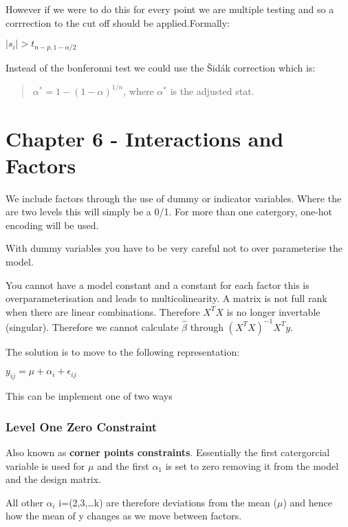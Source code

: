 \documentclass[
  letterpaper,
  DIV=11,
  numbers=noendperiod]{scrreprt}
\begin{document}
However if we were to do this for every point we are multiple testing
and so a corrrection to the cut off should be applied.Formally:

\(|s_i| > t_{n - p, 1-\alpha/2}\)

Instead of the bonferonni test we could use the Šidák correction which
is:

\begin{quote}
\(\alpha^* = 1 - (1-\alpha)^{1/n}\), where \(\alpha^*\) is the adjusted
stat.
\end{quote}

\hypertarget{chapter-6---interactions-and-factors}{%
\section{Chapter 6 - Interactions and
Factors}\label{chapter-6---interactions-and-factors}}

We include factors through the use of dummy or indicator variables.
Where the are two levels this will simply be a 0/1. For more than one
catergory, one-hot encoding will be used.

With dummy variables you have to be very careful not to over
parameterise the model.

You cannot have a model constant and a constant for each factor this is
overparameterisation and leads to multicolinearity. A matrix is not full
rank when there are linear combinations. Therefore \(X^TX\) is no longer
invertable (singular). Therefore we cannot calculate \(\hat{\beta}\)
through \((X^TX)^{-1}X^T y\).

The solution is to move to the following representation:

\(y_{ij} = \mu + \alpha_i + \epsilon_{ij}\)

This can be implement one of two ways

\hypertarget{level-one-zero-constraint}{%
\subsubsection{Level One Zero
Constraint}\label{level-one-zero-constraint}}

Also known as \textbf{corner points constraints}. Essentially the first
catergorcial variable is used for \(\mu\) and the first \(\alpha_1\) is
set to zero removing it from the model and the design matrix.

All other \(\alpha_i\) i=(2,3,\ldots k) are therefore deviations from
the mean (\(\mu\)) and hence how the mean of y changes as we move
between factors.
\end{document}
